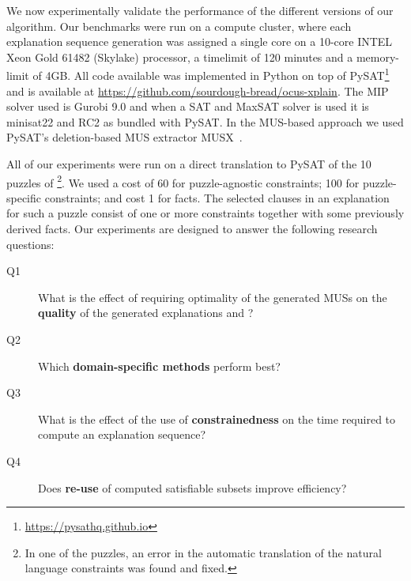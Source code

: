 
We now experimentally validate the performance of the different versions of our algorithm.
Our benchmarks were run on a compute cluster, where each explanation sequence generation was assigned a single core on a 10-core INTEL Xeon Gold 61482 (Skylake) processor, a timelimit of 120 minutes and a memory-limit of 4GB. 
All code available was implemented in Python on top of PySAT\footnote{\url{https://pysathq.github.io}} and is available at \url{https://github.com/sourdough-bread/ocus-xplain}. The MIP solver used is Gurobi 9.0 and when a SAT and MaxSAT solver is used it is minisat22 and RC2 as bundled with PySAT. In the MUS-based approach we used PySAT's deletion-based MUS extractor MUSX~\cite{marques2010minimal}.

All of our experiments were run on a direct translation to PySAT of the 10 puzzles of \citet{ecai/BogaertsGCG20}\footnote{In one of the puzzles, an error in the automatic translation of the natural language constraints was found and fixed.}. %
We used a cost of 60 for puzzle-agnostic constraints; 100 for puzzle-specific constraints; and cost 1 for facts.
The selected clauses in an explanation for such a puzzle consist of one or more constraints together with some previously derived facts. 
%
Our experiments are designed to answer the following research questions: 
\begin{description}
 \item[Q1] What is the effect of requiring optimality of the generated MUSs on the \textbf{quality} of the generated explanations and  ?
 \item[Q2] Which \textbf{domain-specific \grow methods} perform best?
 \item[Q3] What is the effect of the use of \textbf{constrainedness} on the time required to compute an explanation sequence?
 \item[Q4] Does \textbf{re-use} of computed satisfiable subsets improve efficiency?
\end{description}


